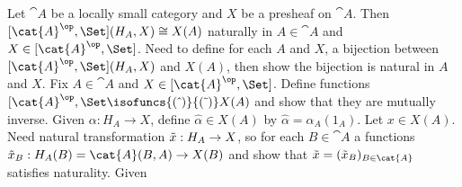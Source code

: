  Let $\cat A$ be a locally small category and $X$ be a presheaf on $\cat A$. Then 
$[\cat{A}^{\op}, \Set](H_A, X) \cong X(A)$
naturally in $A \in \cat A$ and $X \in [\cat{A}^{\op},\Set]$.
 Need to define for each $A$ and $X$, a bijection between $[\cat{A}^{\op}, \Set](H_A, X)$ and $X(A)$, then show the bijection is natural in $A$ and $X$. Fix $A \in \cat{A}$ and $X \in [\cat{A}^{\op}, \Set]$. Define functions $[\cat{A}^{\op}, \Set \isofuncs{(\hat{\ })}{(\Tilde{\ })} X(A)$ and show that they are mutually inverse. 
Given $\alpha:H_A \to X$, define $\hat{\alpha} \in X(A)$ by $\hat{\alpha} = \alpha_A(1_A)$. 
Let $x \in X(A)$. Need natural transformation $\Tilde{x}:H_A \to X$, so for each $B \in \cat{A}$ a functions $\Tilde{x}_B: H_A(B) = \cat{A}(B, A) \to X(B)$ and show that $\Tilde{x} = (\Tilde{x}_B)_{B\in \cat{A}}$ satisfies naturality. 
Given $$